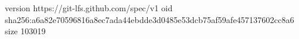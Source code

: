 version https://git-lfs.github.com/spec/v1
oid sha256:a6a82e70596816a8ec7ada44ebdde3d0485e53dcb75af59afe457137602cc8a6
size 103019
